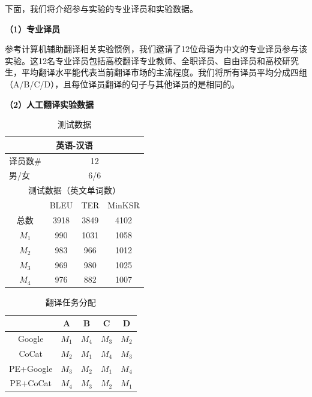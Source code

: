 下面，我们将介绍参与实验的专业译员和实验数据。

\textbf{（1）专业译员}

参考计算机辅助翻译相关实验惯例，我们邀请了12位母语为中文的专业译员参与该实验。这12名专业译员包括高校翻译专业教师、全职译员、自由译员和高校研究生，平均翻译水平能代表当前翻译市场的主流程度。我们将所有译员平均分成四组（A/B/C/D），且每位译员翻译的句子与其他译员的是相同的。

\textbf{（2）人工翻译实验数据}

\begin{table}[htbp]
	\centering	
	\begin{tabular}{|c|c|c|c|}
		\hline
		\multicolumn{4}{|c|}{英语-汉语}                            \\ \hline
		\multicolumn{1}{|l|}{译员数\#} & \multicolumn{3}{c|}{12}  \\ \hline
		\multicolumn{1}{|l|}{男/女}   & \multicolumn{3}{c|}{6/6} \\ \hline
		\multicolumn{4}{|c|}{测试数据（英文单词数）}                      \\ \hline
		\multicolumn{1}{|l|}{}      & BLEU   & TER   & MinKSR  \\ \hline
		总数                          & 3918   & 3849  & 4102    \\ \hline
		$M_1$                        & 990    & 1031  & 1058    \\ \hline
		$M_2$                        & 983    & 966   & 1012    \\ \hline
		$M_3$                        & 969    & 980   & 1025    \\ \hline
		$M_4$                        & 976    & 882   & 1007    \\ \hline
	\end{tabular}
	\caption{测试数据}
	\label{Table_minksr_test_set}
\end{table}

\begin{table}[htbp]
	\centering
	\begin{tabular}{|c|c|c|c|c|}
		\hline
		& A  & B  & C  & D  \\ \hline
		Google    & $M_1$ & $M_4$ & $M_3$ & $M_2$ \\ \hline
		CoCat     & $M_2$ & $M_1$ & $M_4$ & $M_3$ \\ \hline
		PE+Google & $M_3$ & $M_2$ & $M_1$ & $M_4$ \\ \hline
		PE+CoCat  & $M_4$ & $M_3$ & $M_2$ & $M_1$ \\ \hline
	\end{tabular}
	\caption{翻译任务分配}
	\label{Table_minksr_task_assignment}
\end{table}

